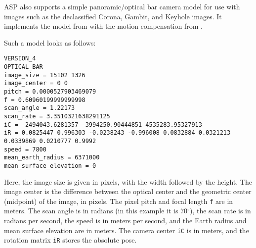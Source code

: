 ASP also supports a simple panoramic/optical bar camera model for use with images such as
the declassified Corona, Gambit, and Keyhole images. It implements the model
from \cite{schenk2003rigorous} with the motion compensation from \cite{sohn2004mathematical}.

Such a model looks as follows:
\begin{verbatim}
VERSION_4
OPTICAL_BAR
image_size = 15102 1326
image_center = 0 0
pitch = 0.0000527903469079
f = 0.60960199999999998
scan_angle = 1.22173 
scan_rate = 3.3510321638291125 
iC = -2494043.6281357 -3994250.90444851 4535283.95327913 
iR = 0.0825447 0.996303 -0.0238243 -0.996008 0.0832884 0.0321213 0.0339869 0.0210777 0.9992
speed = 7800 
mean_earth_radius = 6371000 
mean_surface_elevation = 0
\end{verbatim}

Here, the image size is given in pixels, with the width followed by the
height. The image center is the difference between the optical center
and the geometric center (midpoint) of the image, in pixels. The
pixel pitch and focal length \texttt{f} are in meters. The
scan angle is in radians (in this example it is 70$^\circ$), the scan
rate is in radians per second, the speed is in meters per second, and
the Earth radius and mean surface elevation are in meters. The camera
center \texttt{iC} is in meters, and the rotation matrix \texttt{iR} 
stores the absolute pose.

